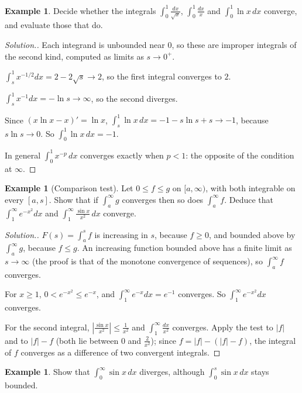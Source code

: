 \documentclass[11pt,a4paper]{article}
\numberwithin{equation}{section}
\theoremstyle{definition}
\newtheorem{exa}[thm]{Example}
\newenvironment{solution}
  {\renewcommand{\qedsymbol}{}\begin{proof}[\textit{Solution}.]}
  {\end{proof}}
\begin{document}
\begin{exa}
Decide whether the integrals $\int_0^1\frac{dx}{\sqrt{x}}$, $\int_0^1\frac{dx}{x}$ and $\int_0^1\ln x\,dx$ converge, and evaluate those that do.
\end{exa}

\begin{solution}
Each integrand is unbounded near $0$, so these are improper integrals of the second kind, computed as limits as $s\longrightarrow0^+$.

$\int_s^1x^{-1/2}dx = 2 - 2\sqrt{s}\longrightarrow 2$, so the first integral converges to $2$.

$\int_s^1x^{-1}dx = -\ln s\longrightarrow\infty$, so the second diverges.

Since $(x\ln x - x)' = \ln x$, $\int_s^1\ln x\,dx = -1 - s\ln s + s\longrightarrow -1$, because $s\ln s\longrightarrow0$. So $\int_0^1\ln x\,dx = -1$.

In general $\int_0^1x^{-p}\,dx$ converges exactly when $p<1$: the opposite of the condition at $\infty$.
\end{solution}

\begin{exa}[Comparison test]
Let $0\leq f\leq g$ on $[a,\infty)$, with both integrable on every $[a,s]$. Show that if $\int_a^\infty g$ converges then so does $\int_a^\infty f$. Deduce that $\int_1^\infty e^{-x^2}dx$ and $\int_1^\infty\frac{\sin x}{x^2}\,dx$ converge.
\end{exa}

\begin{solution}
$F(s) = \int_a^sf$ is increasing in $s$, because $f\geq0$, and bounded above by $\int_a^\infty g$, because $f\leq g$. An increasing function bounded above has a finite limit as $s\longrightarrow\infty$ (the proof is that of the monotone convergence of sequences), so $\int_a^\infty f$ converges.

For $x\geq1$, $0<e^{-x^2}\leq e^{-x}$, and $\int_1^\infty e^{-x}dx = e^{-1}$ converges. So $\int_1^\infty e^{-x^2}dx$ converges.

For the second integral, $\left|\frac{\sin x}{x^2}\right|\leq\frac{1}{x^2}$ and $\int_1^\infty\frac{dx}{x^2}$ converges. Apply the test to $|f|$ and to $|f| - f$ (both lie between $0$ and $\frac{2}{x^2}$); since $f = |f| - (|f| - f)$, the integral of $f$ converges as a difference of two convergent integrals.
\end{solution}

\begin{exa}
Show that $\int_0^\infty\sin x\,dx$ diverges, although $\int_0^s\sin x\,dx$ stays bounded.
\end{exa}
\end{document}
